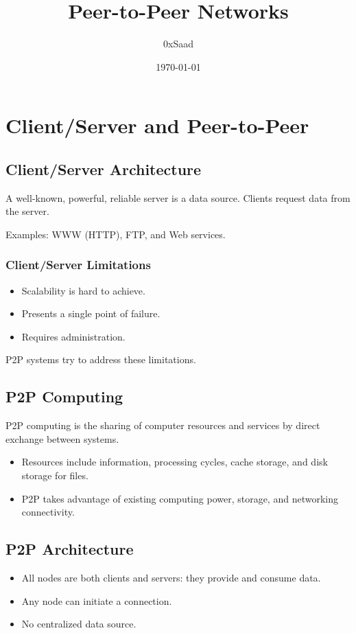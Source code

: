 \documentclass{article}
\title{Peer-to-Peer Networks}
\author{0xSaad}
\date{\today}
\begin{document}
\maketitle

\section{Client/Server and Peer-to-Peer}

\subsection{Client/Server Architecture}

A well-known, powerful, reliable server is a data source. Clients request data from the server.

Examples: WWW (HTTP), FTP, and Web services.

\subsubsection{Client/Server Limitations}
\begin{itemize}
    \item Scalability is hard to achieve.
    \item Presents a single point of failure.
    \item Requires administration.
\end{itemize}

P2P systems try to address these limitations.

\subsection{P2P Computing}

P2P computing is the sharing of computer resources and services by direct exchange between systems.

\begin{itemize}
    \item Resources include information, processing cycles, cache storage, and disk storage for files.
    \item P2P takes advantage of existing computing power, storage, and networking connectivity.
\end{itemize}

\subsection{P2P Architecture}
\begin{itemize}
    \item All nodes are both clients and servers: they provide and consume data.
    \item Any node can initiate a connection.
    \item No centralized data source.
\end{itemize}
\end{document}

